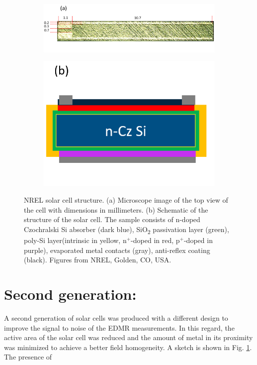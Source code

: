\documentclass[a4paper]{book}
\newcommand{\tsub}{\textsubscript}
\begin{document}
	\begin{figure}[b]
		\centering
		\begin{subfigure}{.65\textwidth}
			\centering
			\includegraphics[width=\textwidth]{images/3_minicell_microscope.png}
		\end{subfigure}%
		\begin{subfigure}{.35\textwidth}
			\centering
			\includegraphics[width=.95\textwidth]{images/3_minicells.png}
		\end{subfigure}
		\caption{NREL solar cell structure. (a) Microscope image of the top view of the cell with dimensions in millimeters. (b) Schematic of the structure of the solar cell. The sample consists of n-doped Czochralski Si absorber (dark blue), SiO\tsub 2 passivation layer (green), poly-Si layer(intrinsic in yellow, n$^+$-doped in red, p$^+$-doped in purple), evaporated metal contacts (gray), anti-reflex coating (black). Figures from NREL, Golden, CO, USA.}
		\label{fig:3_minicells}
	\end{figure}
	
	\section{Second generation: }
	A second generation of solar cells was produced with a different design to improve the signal to noise of the EDMR measurements. In this regard, the active area of the solar cell was reduced and the amount of metal in its proximity was minimized to achieve a better field homogeneity. A sketch is shown in Fig. \ref{}.\\
	The presence of 
	
\end{document}
